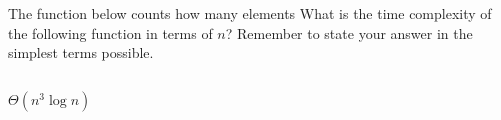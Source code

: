 \begin{prob}
    The function below counts how many elements 
    What is the time complexity of the following function in terms of $n$?
    Remember to state your answer in the simplest terms possible.

    \inputminted{python}{./code.py}

    \begin{soln}
        $\Theta(n^3 \log n)$
    \end{soln}

\end{prob}
